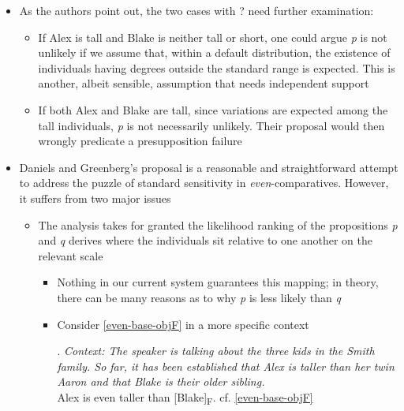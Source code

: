 \documentclass[11pt,letterpaper]{scrartcl}
\newcommand{\alignright}{\hspace*{\fill}}
\newcommand{\sub}[1]{\textsubscript{#1}}
\begin{document}
\begin{itemize}
    \item As the authors point out, the two cases with ? need further examination: 
    
    \begin{itemize}
        \item If Alex is tall and Blake is neither tall or short, one could argue \textit{p} is not unlikely if we assume that, within a default distribution, the existence of individuals having degrees outside the standard range is expected. This is another, albeit sensible, assumption that needs independent support
        
        \item If both Alex and Blake are tall, since variations are expected among the tall individuals, \textit{p} is not necessarily unlikely. Their proposal would then wrongly predicate a presupposition failure
    \end{itemize}
    
    \item Daniels and Greenberg's proposal is a reasonable and straightforward attempt to address the puzzle of standard sensitivity in \textit{even}-comparatives. However, it suffers from two major issues
        
        \begin{itemize}
            \item The analysis takes for granted the likelihood ranking of the propositions \textit{p} and \textit{q} derives where the individuals sit relative to one another on the relevant scale
                \begin{itemize}
                    \item Nothing in our current system guarantees this mapping; in theory, there can be many reasons as to why \textit{p} is less likely than \textit{q}
                    
                    \item Consider \ref{even-base-objF} in a more specific context
                    
                    \ex. \label{sibling} \textit{Context: The speaker is talking about the three kids in the Smith family. So far, it has been established that Alex is taller than her twin Aaron and that Blake is their older sibling.} \\
                    Alex is even taller than [Blake]\sub{F}. \alignright cf. \ref{even-base-objF}
                    

\end{itemize}
\end{itemize}
\end{itemize}
\end{document}
